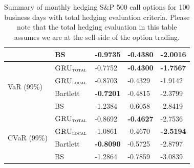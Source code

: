 \documentclass[letterpaper,12pt,titlepage,oneside,final]{book}
\numberwithin{equation}{section}
\theoremstyle{definition}
\newcommand{\modelT}{\textsc{GRU}_{\textsc{total}}}
\newcommand{\modelL}{\textsc{GRU}_{\textsc{local}}}
\begin{document}
\begin{table}[htp!]
\begin{tabular}{ll|l|l|l|}
		\multicolumn{1}{|l|}{}                                & BS       & -0.9735          & -0.4380          & -2.0016          \\ \hline
		\multicolumn{1}{|l|}{\multirow{4}{*}{VaR (99\%)}}     & $\modelT$    & -0.7752          & \textbf{-0.4300} & \textbf{-1.7567} \\  
		\multicolumn{1}{|l|}{}                                & $\modelL$    & -0.8703          & -0.4329          & -1.9142          \\  
		\multicolumn{1}{|l|}{}                                & Bartlett & \textbf{-0.7201} & -0.4815          & -2.3799          \\  
		\multicolumn{1}{|l|}{}                                & BS       & -1.2384          & -0.6058          & -2.8419          \\ \hline
		\multicolumn{1}{|l|}{\multirow{4}{*}{CVaR (99\%)}}    & $\modelT$    & -0.8692          & \textbf{-0.4627} & -2.7536          \\  
		\multicolumn{1}{|l|}{}                                & $\modelL$    & -1.0861          & -0.4670          & \textbf{-2.5194} \\  
		\multicolumn{1}{|l|}{}                                & Bartlett & \textbf{-0.8090}  & -0.5725          & -2.8797          \\  
		\multicolumn{1}{|l|}{}                                & BS       & -1.2864          & -0.7859          & -3.0839          \\ \hline
	\end{tabular}
	\caption{Summary of monthly hedging S\&P 500 call options for 100 business days with total hedging evaluation criteria. Please note that the total hedging evaluation in this table assumes we are at the sell-side of the option trading.} \label{table:CallTotalM}
\end{table}
\end{document}
